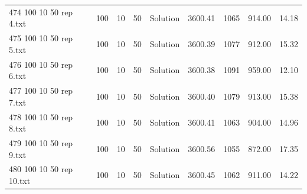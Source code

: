 \begin{longtable}{lrrllrrrr}
474 100 10 50 rep 4.txt & 100 & 10 & 50 & Solution & 3600.41 & 1065 & 914.00 & 14.18\\
475 100 10 50 rep 5.txt & 100 & 10 & 50 & Solution & 3600.39 & 1077 & 912.00 & 15.32\\
476 100 10 50 rep 6.txt & 100 & 10 & 50 & Solution & 3600.38 & 1091 & 959.00 & 12.10\\
477 100 10 50 rep 7.txt & 100 & 10 & 50 & Solution & 3600.40 & 1079 & 913.00 & 15.38\\
478 100 10 50 rep 8.txt & 100 & 10 & 50 & Solution & 3600.41 & 1063 & 904.00 & 14.96\\
479 100 10 50 rep 9.txt & 100 & 10 & 50 & Solution & 3600.56 & 1055 & 872.00 & 17.35\\
480 100 10 50 rep 10.txt & 100 & 10 & 50 & Solution & 3600.45 & 1062 & 911.00 & 14.22\\
\end{longtable}

